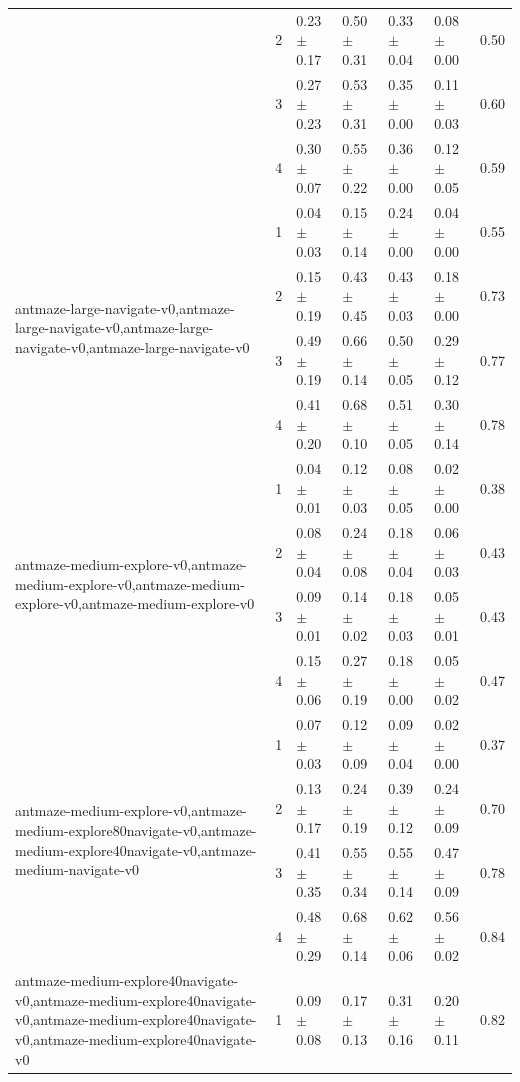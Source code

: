 \begin{tabular}{lllllll}
 & 2 & 0.23 $\pm$ 0.17 & 0.50 $\pm$ 0.31 & 0.33 $\pm$ 0.04 & 0.08 $\pm$ 0.00 & 0.50 \\
 & 3 & 0.27 $\pm$ 0.23 & 0.53 $\pm$ 0.31 & 0.35 $\pm$ 0.00 & 0.11 $\pm$ 0.03 & 0.60 \\
 & 4 & 0.30 $\pm$ 0.07 & 0.55 $\pm$ 0.22 & 0.36 $\pm$ 0.00 & 0.12 $\pm$ 0.05 & 0.59 \\
\cline{1-7}
\multirow[t]{4}{*}{antmaze-large-navigate-v0,antmaze-large-navigate-v0,antmaze-large-navigate-v0,antmaze-large-navigate-v0} & 1 & 0.04 $\pm$ 0.03 & 0.15 $\pm$ 0.14 & 0.24 $\pm$ 0.00 & 0.04 $\pm$ 0.00 & 0.55 \\
 & 2 & 0.15 $\pm$ 0.19 & 0.43 $\pm$ 0.45 & 0.43 $\pm$ 0.03 & 0.18 $\pm$ 0.00 & 0.73 \\
 & 3 & 0.49 $\pm$ 0.19 & 0.66 $\pm$ 0.14 & 0.50 $\pm$ 0.05 & 0.29 $\pm$ 0.12 & 0.77 \\
 & 4 & 0.41 $\pm$ 0.20 & 0.68 $\pm$ 0.10 & 0.51 $\pm$ 0.05 & 0.30 $\pm$ 0.14 & 0.78 \\
\cline{1-7}
\multirow[t]{4}{*}{antmaze-medium-explore-v0,antmaze-medium-explore-v0,antmaze-medium-explore-v0,antmaze-medium-explore-v0} & 1 & 0.04 $\pm$ 0.01 & 0.12 $\pm$ 0.03 & 0.08 $\pm$ 0.05 & 0.02 $\pm$ 0.00 & 0.38 \\
 & 2 & 0.08 $\pm$ 0.04 & 0.24 $\pm$ 0.08 & 0.18 $\pm$ 0.04 & 0.06 $\pm$ 0.03 & 0.43 \\
 & 3 & 0.09 $\pm$ 0.01 & 0.14 $\pm$ 0.02 & 0.18 $\pm$ 0.03 & 0.05 $\pm$ 0.01 & 0.43 \\
 & 4 & 0.15 $\pm$ 0.06 & 0.27 $\pm$ 0.19 & 0.18 $\pm$ 0.00 & 0.05 $\pm$ 0.02 & 0.47 \\
\cline{1-7}
\multirow[t]{4}{*}{antmaze-medium-explore-v0,antmaze-medium-explore80navigate-v0,antmaze-medium-explore40navigate-v0,antmaze-medium-navigate-v0} & 1 & 0.07 $\pm$ 0.03 & 0.12 $\pm$ 0.09 & 0.09 $\pm$ 0.04 & 0.02 $\pm$ 0.00 & 0.37 \\
 & 2 & 0.13 $\pm$ 0.17 & 0.24 $\pm$ 0.19 & 0.39 $\pm$ 0.12 & 0.24 $\pm$ 0.09 & 0.70 \\
 & 3 & 0.41 $\pm$ 0.35 & 0.55 $\pm$ 0.34 & 0.55 $\pm$ 0.14 & 0.47 $\pm$ 0.09 & 0.78 \\
 & 4 & 0.48 $\pm$ 0.29 & 0.68 $\pm$ 0.14 & 0.62 $\pm$ 0.06 & 0.56 $\pm$ 0.02 & 0.84 \\
\cline{1-7}
\multirow[t]{4}{*}{antmaze-medium-explore40navigate-v0,antmaze-medium-explore40navigate-v0,antmaze-medium-explore40navigate-v0,antmaze-medium-explore40navigate-v0} & 1 & 0.09 $\pm$ 0.08 & 0.17 $\pm$ 0.13 & 0.31 $\pm$ 0.16 & 0.20 $\pm$ 0.11 & 0.82 \\

\end{tabular}
